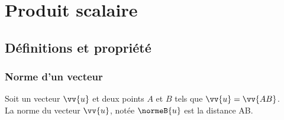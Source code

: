 \chapter{Produit scalaire}
\thispagestyle{fancy}

\section{Définitions et propriété}

\subsection{Norme d'un vecteur}

    \begin{definition}
        Soit un vecteur $\vv{u}$ et deux points $A$ et $B$ tels que $\vv{u}=\vv{AB}$.\\
        La norme du vecteur $\vv{u}$, notée $\normeB{u}$ est la distance AB.	
    \end{definition}
    
